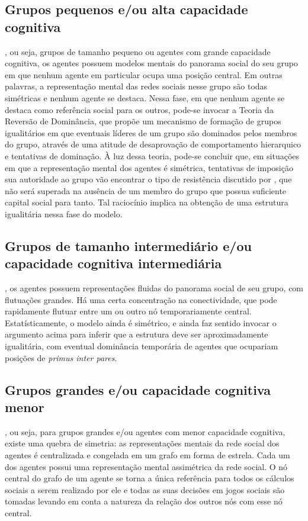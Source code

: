 \subsection{Grupos pequenos e/ou alta capacidade cognitiva}
, ou seja, grupos de tamanho pequeno ou agentes com grande capacidade cognitiva, os agentes possuem modelos mentais do panorama social do seu grupo em que nenhum agente em particular ocupa uma posição central. Em outras palavras, a representação mental das redes sociais nesse grupo são todas simétricas e nenhum agente se destaca. Nessa fase, em que nenhum agente se destaca como referência social para os outros, pode-se invocar a Teoria da Reversão de Dominância\cite{Boehm2001,Boehm1993}, que propõe um mecanismo de formação de grupos igualitários em que eventuais líderes de um grupo são dominados pelos membros do grupo, através de uma atitude de desaprovação de comportamento hierarquico e tentativas de dominação. À luz dessa teoria, pode-se concluir que, em  situações em que a representação mental dos agentes é simétrica, tentativas de imposição sua autoridade ao grupo vão encontrar o tipo de resistência discutido por \citeauthor{Boehm1993}, que não será superada na ausência de um membro do grupo que possua suficiente capital social para tanto. Tal raciocínio implica na obtenção de uma estrutura igualitária nessa fase do modelo.

\subsection{Grupos de tamanho intermediário e/ou capacidade cognitiva intermediária}
, os agentes possuem representações fluidas do panorama social de seu grupo, com flutuações grandes. Há uma certa concentração na conectividade, que pode rapidamente flutuar entre um ou outro nó temporariamente central. Estatísticamente, o modelo ainda é simétrico, e ainda faz sentido invocar o argumento acima para inferir que a estrutura deve ser aproximadamente igualitária, com eventual dominância temporária de agentes que ocupariam posições de \textit{primus inter pares}. 
 
\subsection{Grupos grandes e/ou capacidade cognitiva menor}
, ou seja, para grupos grandes e/ou agentes com menor capacidade cognitiva, existe uma quebra de simetria: as representações mentais da rede social dos agentes é centralizada e congelada em um grafo em forma de estrela. Cada um dos agentes possui uma representação mental assimétrica da rede social. O nó central do grafo de um agente se torna a única referência para todos os cálculos sociais a serem realizado por ele e todas as suas decisões em jogos sociais são tomadas levando em conta a natureza da relação dos outros nós com esse nó central. 
 

